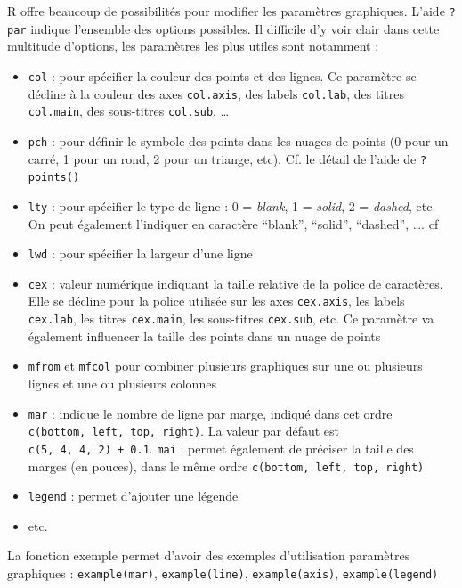 \documentclass[
]{book}
\providecommand{\tightlist}{%
  \setlength{\itemsep}{0pt}\setlength{\parskip}{0pt}}
\begin{document}
R offre beaucoup de possibilités pour modifier les paramètres graphiques. L'aide \texttt{?par} indique l'ensemble des options possibles. Il difficile d'y voir clair dans cette multitude d'options, les paramètres les plus utiles sont notamment :

\begin{itemize}
\tightlist
\item
  \texttt{col} : pour spécifier la couleur des points et des lignes. Ce paramètre se décline à la couleur des axes \texttt{col.axis}, des labels \texttt{col.lab}, des titres \texttt{col.main}, des sous-titres \texttt{col.sub}, \ldots{}
\item
  \texttt{pch} : pour définir le symbole des points dans les nuages de points (0 pour un carré, 1 pour un rond, 2 pour un triange, etc). Cf. le détail de l'aide de \texttt{?points()}
\item
  \texttt{lty} : pour spécifier le type de ligne : 0 = \emph{blank}, 1 = \emph{solid}, 2 = \emph{dashed}, etc. On peut également l'indiquer en caractère ``blank'', ``solid'', ``dashed'', \ldots. cf
\item
  \texttt{lwd} : pour spécifier la largeur d'une ligne
\item
  \texttt{cex} : valeur numérique indiquant la taille relative de la police de caractères. Elle se décline pour la police utilisée sur les axes \texttt{cex.axis}, les labels \texttt{cex.lab}, les titres \texttt{cex.main}, les sous-titres \texttt{cex.sub}, etc. Ce paramètre va également influencer la taille des points dans un nuage de points
\item
  \texttt{mfrom} et \texttt{mfcol} pour combiner plusieurs graphiques sur une ou plusieurs lignes et une ou plusieurs colonnes
\item
  \texttt{mar} : indique le nombre de ligne par marge, indiqué dans cet ordre \texttt{c(bottom,\ left,\ top,\ right)}. La valeur par défaut est \texttt{c(5,\ 4,\ 4,\ 2)\ +\ 0.1}. \texttt{mai} : permet également de préciser la taille des marges (en pouces), dans le même ordre \texttt{c(bottom,\ left,\ top,\ right)}
\item
  \texttt{legend} : permet d'ajouter une légende
\item
  etc.
\end{itemize}

La fonction exemple permet d'avoir des exemples d'utilisation paramètres graphiques : \texttt{example(mar)}, \texttt{example(line)}, \texttt{example(axis)}, \texttt{example(legend)}
\end{document}
